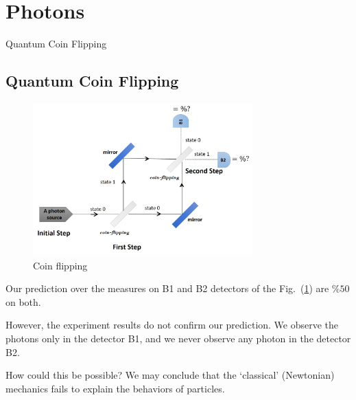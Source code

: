 \section{Photons}
\begin{introduction}
	\item Quantum Coin Flipping
\end{introduction}

\subsection{Quantum Coin Flipping}
\begin{figure}[ht]
    \centering
    \includegraphics[width=320px]{qclass/images/photon6}
    \caption{Coin flipping}
    \label{fig:coin-flipping}
\end{figure}

Our prediction over the measures on B1 and B2 detectors of the Fig.~(\ref{fig:coin-flipping}) are $\%50$ on both.

However, the experiment results do not confirm our prediction.
We observe the photons only in the detector B1, and we never observe any photon in the detector B2.

How could this be possible?
We may conclude that the `classical' (Newtonian) mechanics fails to explain the behaviors of particles.